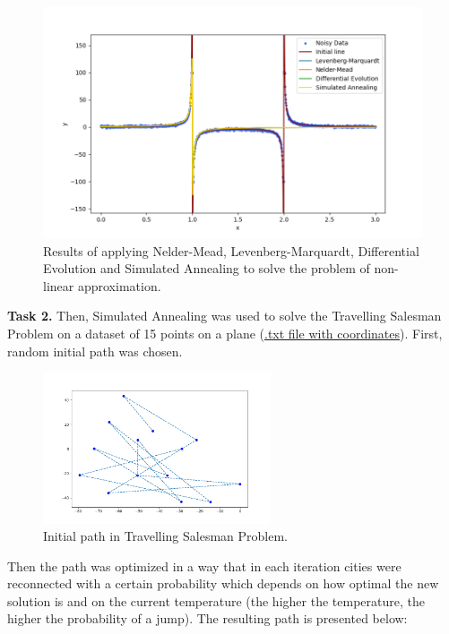 \documentclass[12pt, a4paper]{article}
\begin{document}
\begin{figure}[!h]
\centering
\includegraphics[width=\textwidth]{pic1.png}
\caption{Results of applying Nelder-Mead, Levenberg-Marquardt, Differential Evolution and Simulated Annealing to solve the problem of non-linear approximation.}
\end{figure}

\newpage

\textbf{Task 2.} Then, Simulated Annealing was used to solve the Travelling Salesman Problem on a dataset of 15 points on a plane (\href{https://github.com/Dormant512/itmo_lab_listings/blob/main/coords.txt}{.txt file with coordinates}). First, random initial path was chosen.

\vspace{-3mm}
\begin{figure}[!h]
\centering
\includegraphics[width=0.6\textwidth]{pic2.png}
\caption{Initial path in Travelling Salesman Problem.}
\end{figure}

Then the path was optimized in a way that in each iteration cities were reconnected with a certain probability which depends on how optimal the new solution is and on the current temperature (the higher the temperature, the higher the probability of a jump). The resulting path is presented below:
\end{document}
